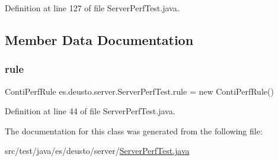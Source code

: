 Definition at line 127 of file Server\+Perf\+Test.\+java.



\subsection{Member Data Documentation}
\mbox{\label{classes_1_1deusto_1_1server_1_1_server_perf_test_a34a5221b5b0280bcdd240acb1d1f681b}} 
\subsubsection{\texorpdfstring{rule}{rule}}
{\footnotesize\ttfamily Conti\+Perf\+Rule es.\+deusto.\+server.\+Server\+Perf\+Test.\+rule = new Conti\+Perf\+Rule()}



Definition at line 44 of file Server\+Perf\+Test.\+java.



The documentation for this class was generated from the following file\+:\begin{DoxyCompactItemize}
\item 
src/test/java/es/deusto/server/\hyperlink{_server_perf_test_8java}{Server\+Perf\+Test.\+java}\end{DoxyCompactItemize}
